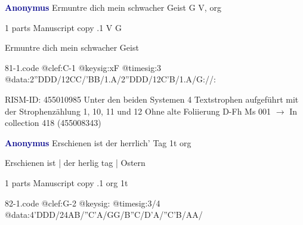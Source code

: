 \documentclass[twocolumn]{book}
\begin{document}
\newline \par \vspace{7pt} \textcolor{darkblue}{\textbf{Anonymus  }}
\newline Ermuntre dich mein schwacher Geist  G  
\newline V, org
\newline \begin{itshape}\end{itshape} 
\newline \textcolor{darkblue}{}  1 parts  
\newline Manuscript copy
.1  V  G
\newline \begin{footnotesize} Ermuntre dich mein schwacher Geist \end{footnotesize}  
\begin{filecontents*}{81-1.code}
@clef:C-1
@keysig:xF
@timesig:3
@data:2''DDD/12CC/'BB/1.A/2''DDD/12C'B/1.A/G://:
\end{filecontents*}
\newline
%

\newline RISM-ID: 455010985
\newline Unter den beiden Systemen 4 Textstrophen aufgeführt mit der Strophenzählung 1, 10, 11 und 12
\newline Ohne alte Foliierung
\newline D-Fh  Ms 001
\newline $\rightarrow$ In collection 418 (455008343)

\newline \par \vspace{7pt} \textcolor{darkblue}{\textbf{Anonymus  }}
\newline Erschienen ist der herrlich' Tag  1t  
\newline org
\newline \begin{itshape}[f.32v, at left:] Erschienen ist | der herlig tag | Ostern\end{itshape} 
\newline \textcolor{darkblue}{}  1 parts  
\newline Manuscript copy
.1  org  1t  
\begin{filecontents*}{82-1.code}
@clef:G-2
@keysig:
@timesig:3/4
@data:4'DDD/24AB/''C'A/GG/B''C/D'A/''C'B/AA/
\end{filecontents*}
\newline
%
\end{document}
